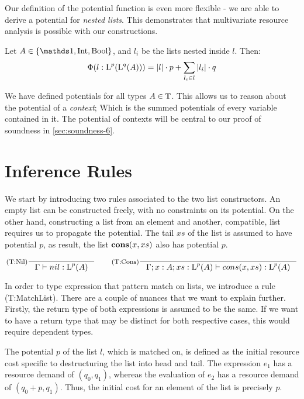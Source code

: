 Our definition of the potential function is even more flexible - we are able to derive a potential for \emph{nested lists}. This demonstrates that multivariate resource analysis is possible with our constructions.

\begin{corollary}\label{cor:potential-nested-list}
   Let \(A \in \{\unit, \typeint, \bool\}\), and \(l_i\) be the lists nested inside \(l\). Then:
   \[
      \Phi(l : \text{L}^{p}(\text{L}^{q}(A))) = |l| \cdot p + \sum_{l_i \in l} |l_i| \cdot q
   \]
\end{corollary}

We have defined potentials for all types \(A \in \mathbb{T}\). This allows us to reason about the potential of a \emph{context}; Which is the summed potentials of every variable contained in it. The potential of contexts will be central to our proof of soundness in \cref{sec:soundness-6}.

\section{Inference Rules}

We start by introducing two rules associated to the two list constructors. An empty list can be constructed freely, with no constraints on its potential. On the other hand, constructing a list from an element and another, compatible, list requires us to propagate the potential. The tail \(xs\) of the list is assumed to have potential \(p\), as result, the list \(\textbf{cons}(x, xs)\) also has potential \(p\). 

\[
   \inference[(T:Nil)]
   {}
   {\typing{\Gamma}{nil}{\ralist{p}{A}}}
   \qquad
   \inference[(T:Cons)]
   {}
   {\typing{\Gamma;x : A; xs : \ralist{p}{A}}{cons(x, xs)}{\ralist{p}{A}}}
\]

In order to type expression that pattern match on lists, we introduce a rule (T:MatchList). There are a couple of nuances that we want to explain further. Firstly, the return type of both expressions is assumed to be the same. If we want to have a return type that may be distinct for both respective cases, this would require dependent types. 

The potential \(p\) of the list \(l\), which is matched on, is defined as the initial resource cost specific to destructuring the list into head and tail. The expression \(e_1\) has a resource demand of \((q_0, q_1)\), whereas the evaluation of \(e_2\) has a resource demand of \((q_0 + p, q_1)\). Thus, the initial cost for an element of the list is precisely \(p\).  

